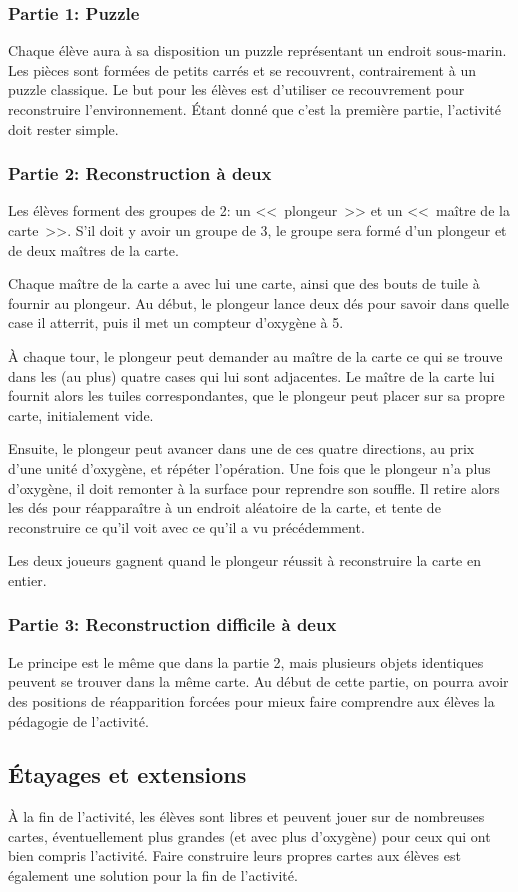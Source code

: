 \documentclass[a4paper,11pt]{article}
\begin{document}
\subsubsection*{Partie 1: Puzzle}

Chaque élève aura à sa disposition un puzzle représentant un endroit sous-marin. Les pièces sont formées de petits carrés et se recouvrent, contrairement à un puzzle classique. Le but pour les élèves est d'utiliser ce recouvrement pour reconstruire l'environnement. Étant donné que c'est la première partie, l'activité doit rester simple.

\subsubsection*{Partie 2: Reconstruction à deux}

Les élèves forment des groupes de 2: un <<~plongeur~>> et un <<~maître de la carte~>>. S'il doit y avoir un groupe de 3, le groupe sera formé d'un plongeur et de deux maîtres de la carte.

Chaque maître de la carte a avec lui une carte, ainsi que des bouts de tuile à fournir au plongeur. Au début, le plongeur lance deux dés pour savoir dans quelle case il atterrit, puis il met un compteur d'oxygène à 5.

À chaque tour, le plongeur peut demander au maître de la carte ce qui se trouve dans les (au plus) quatre cases qui lui sont adjacentes. Le maître de la carte lui fournit alors les tuiles correspondantes, que le plongeur peut placer sur sa propre carte, initialement vide.

Ensuite, le plongeur peut avancer dans une de ces quatre directions, au prix d'une unité d'oxygène, et répéter l'opération. Une fois que le plongeur n'a plus d'oxygène, il doit remonter à la surface pour reprendre son souffle. Il retire alors les dés pour réapparaître à un endroit aléatoire de la carte, et tente de reconstruire ce qu'il voit avec ce qu'il a vu précédemment.

Les deux joueurs gagnent quand le plongeur réussit à reconstruire la carte en entier.

\subsubsection*{Partie 3: Reconstruction difficile à deux}

Le principe est le même que dans la partie 2, mais plusieurs objets identiques peuvent se trouver dans la même carte. Au début de cette partie, on pourra avoir des positions de réapparition forcées pour mieux faire comprendre aux élèves la pédagogie de l'activité.

\subsection{Étayages et extensions}
À la fin de l'activité, les élèves sont libres et peuvent jouer sur de nombreuses cartes, éventuellement plus grandes (et avec plus d'oxygène) pour ceux qui ont bien compris l'activité. Faire construire leurs propres cartes aux élèves est également une solution pour la fin de l'activité.
\end{document}
